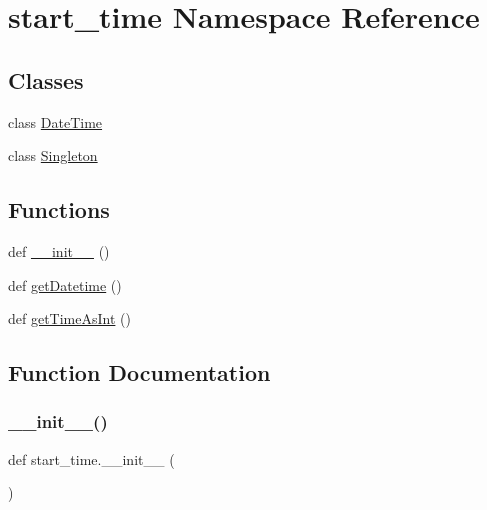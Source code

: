 \hypertarget{namespacestart__time}{}\section{start\+\_\+time Namespace Reference}
\label{namespacestart__time}
\subsection*{Classes}
\begin{DoxyCompactItemize}
\item 
class \hyperlink{classstart__time_1_1_date_time}{Date\+Time}
\item 
class \hyperlink{classstart__time_1_1_singleton}{Singleton}
\end{DoxyCompactItemize}
\subsection*{Functions}
\begin{DoxyCompactItemize}
\item 
def \hyperlink{namespacestart__time_a9c9bd378729a13c96a22c8b079ea172c}{\+\_\+\+\_\+init\+\_\+\+\_\+} ()
\item 
def \hyperlink{namespacestart__time_a52171f611eeff20ff03fd88c834220b0}{get\+Datetime} ()
\item 
def \hyperlink{namespacestart__time_a822927985dec03d75bfdf136d6ac6a97}{get\+Time\+As\+Int} ()
\end{DoxyCompactItemize}


\subsection{Function Documentation}
\mbox{\label{namespacestart__time_a9c9bd378729a13c96a22c8b079ea172c}} 
\subsubsection{\texorpdfstring{\+\_\+\+\_\+init\+\_\+\+\_\+()}{\_\_init\_\_()}}
{\footnotesize\ttfamily def start\+\_\+time.\+\_\+\+\_\+init\+\_\+\+\_\+ (\begin{DoxyParamCaption}{ }\end{DoxyParamCaption})}



